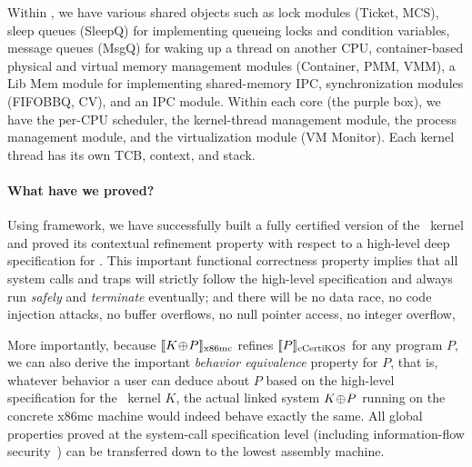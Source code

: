 Within \cCTOS, we have various shared objects such as lock modules
(Ticket, MCS), sleep queues (SleepQ) for implementing queueing locks
and condition variables, message queues (MsgQ) for waking up a
thread on another CPU, container-based physical and virtual memory
management modules (Container, PMM, VMM), a Lib Mem module for
implementing shared-memory IPC, synchronization modules (FIFOBBQ,
CV), and an IPC module. Within each core (the purple box), we have
the per-CPU scheduler, the kernel-thread management module, the process
management module, and the virtualization module (VM Monitor). Each
kernel thread has its own TCB, context, and stack.

\vspace{-5pt}
\paragraph{What have we proved?}
Using \CTOS framework, we have successfully built a fully certified version of
the \cCTOS\ kernel and proved its contextual refinement property with
respect to a high-level deep specification for \cCTOS.  This important
functional correctness property implies that all system calls and
traps will strictly follow the high-level specification and always run
{\em safely} and {\em terminate} eventually; and there will be no data
race, no code injection attacks, no buffer overflows, no null pointer
access, no integer overflow, \etc{}

More importantly, because $\sem{\rm{}x86mc}{K\join{}P}$ refines
$\sem{\rm\cCTOS}{P}$ for any program $P$, we can also derive the
important {\em behavior equivalence} property for $P$, that is,
whatever behavior a user can deduce about $P$ based on the high-level
specification for the \cCTOS\ kernel $K$, the actual linked
system $K\join{}P$ running on the concrete x86mc machine would indeed
behave exactly the same.  All global properties proved at the
system-call specification level (including information-flow
security~\cite{costanzo16}) can be transferred down to the lowest
assembly machine.




